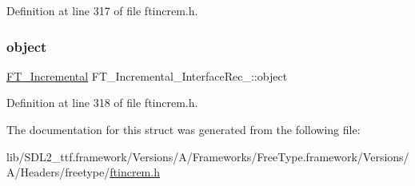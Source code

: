 Definition at line 317 of file ftincrem.\+h.

\mbox{\label{struct_f_t___incremental___interface_rec___ae4f527f53465ff84ad01b484fe721a88}} 
\subsubsection{\texorpdfstring{object}{object}}
{\footnotesize\ttfamily \mbox{\hyperlink{ftincrem_8h_a2ec8ac9cacdca1f493e4c3c5d27ed3c4}{F\+T\+\_\+\+Incremental}} F\+T\+\_\+\+Incremental\+\_\+\+Interface\+Rec\+\_\+\+::object}



Definition at line 318 of file ftincrem.\+h.



The documentation for this struct was generated from the following file\+:\begin{DoxyCompactItemize}
\item 
lib/\+S\+D\+L2\+\_\+ttf.\+framework/\+Versions/\+A/\+Frameworks/\+Free\+Type.\+framework/\+Versions/\+A/\+Headers/freetype/\mbox{\hyperlink{ftincrem_8h}{ftincrem.\+h}}\end{DoxyCompactItemize}
